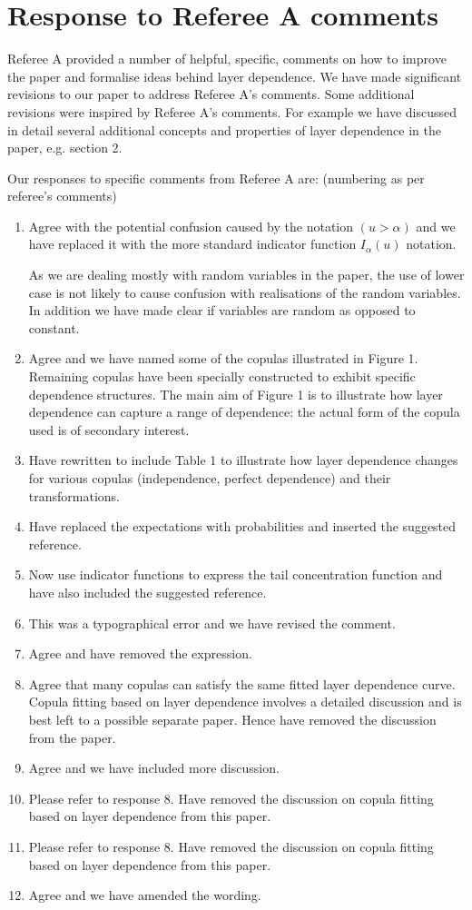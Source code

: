\documentclass[a4paper, 12pt]{report}
\begin{document}
\section*{Response to Referee A comments}


Referee A provided a number of helpful, specific, comments on how to improve the paper and formalise ideas behind layer dependence. We have made significant revisions to our paper to address Referee A's comments. Some additional revisions were inspired by Referee A's comments.  For example we have discussed in detail several additional concepts and properties of layer dependence in the paper, e.g. section 2.


Our responses to specific comments from Referee A are: (numbering as per referee's comments)

\begin{enumerate}
\item	Agree with the potential confusion caused by the notation $(u>\alpha)$ and we have replaced it with the more standard indicator function $I_\alpha(u)$ notation.

As we are dealing mostly with random variables in the paper, the use of lower case is not likely to cause confusion with realisations of the random variables. In addition we have made clear if variables are random as opposed to constant.


\item	Agree and we have named some of the copulas illustrated in Figure 1. Remaining copulas have been specially constructed to exhibit specific dependence structures. The main aim of Figure 1 is to illustrate how layer dependence can capture a range of dependence: the actual form of the copula used is of secondary interest.
\item	Have rewritten to include Table 1 to illustrate how layer dependence changes for various copulas (independence, perfect dependence) and their transformations.
\item	Have replaced the expectations with probabilities and inserted the suggested reference.
\item	Now use indicator functions to express the tail concentration function and have also included the suggested reference.
\item	This was a typographical error and we have revised the comment.
\item	Agree and have removed the expression.
\item	Agree that many copulas can satisfy the same fitted layer dependence curve. Copula fitting based on layer dependence involves a detailed discussion and is best left to a possible separate paper. Hence have removed the discussion from the paper.
\item	Agree and we have included more discussion.
\item	Please refer to response 8. Have removed the discussion on copula fitting based on layer dependence from this paper.
\item	Please refer to response 8. Have removed the discussion on copula fitting based on layer dependence from this paper.
\item	Agree and we have amended the wording.


\end{enumerate}
\end{document}
